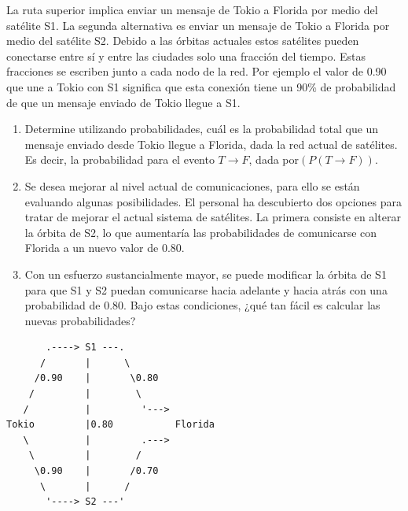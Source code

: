 La ruta superior implica enviar un mensaje de Tokio a Florida por medio del satélite S1. La segunda alternativa es enviar un mensaje de Tokio a Florida por medio del satélite S2. Debido a las órbitas actuales estos satélites pueden conectarse entre sí y entre las ciudades solo una fracción del tiempo. Estas fracciones se escriben junto a cada nodo de la red. Por ejemplo el valor de 0.90 que une a Tokio con S1 significa que esta conexión tiene un 90\% de probabilidad de que un mensaje enviado de Tokio llegue a S1.

\begin{enumerate}
\item Determine utilizando probabilidades, cuál es la probabilidad total que un mensaje enviado desde Tokio llegue a Florida, dada la red actual de satélites. Es decir, la probabilidad para el evento $T \rightarrow F$, dada por$ ( P(T \rightarrow F) )$.


\item Se desea mejorar al nivel actual de comunicaciones, para ello se están evaluando algunas posibilidades. El personal ha descubierto dos opciones para tratar de mejorar el actual sistema de satélites. La primera consiste en alterar la órbita de S2, lo que aumentaría las probabilidades de comunicarse con Florida a un nuevo valor de  0.80.


\item Con un esfuerzo sustancialmente mayor, se puede modificar la órbita de S1 para que S1 y S2 puedan comunicarse hacia adelante y hacia atrás con una probabilidad de 0.80. Bajo estas condiciones, ¿qué tan fácil es calcular las nuevas probabilidades?

\end{enumerate}
\begin{verbatim}
       .----> S1 ---.
      /       |      \
     /0.90    |       \0.80
    /         |        \
   /          |         '--->
Tokio         |0.80           Florida
   \          |         .--->
    \         |        /
     \0.90    |       /0.70
      \       |      /
       '----> S2 ---'
\end{verbatim}